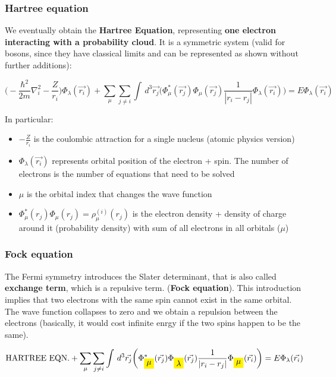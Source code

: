		\subsubsection{Hartree equation}
		We eventually obtain the \textbf{Hartree Equation}, representing \textbf{one electron interacting with a probability cloud}.
		It is a symmetric system (valid for bosons, since they have classical limits and can be represented as shown without further additions):

		$$\bigg(-\frac{\hbar^2}{2m}\nabla^2_i-\frac{Z}{r_i}\bigg)\Phi_\lambda(\vec{r_i})+\sum_\mu \sum_{j \neq i} \int\,d^3\vec{r_j}\bigg(\Phi^*_\mu(\vec{r_j})\Phi_\mu(\vec{r_j})\frac{1}{|r_i-r_j|}\Phi_\lambda(\vec{r_i})\bigg)=E\Phi_\lambda(\vec{r_i})$$

		In particular:

		\begin{multicols}{2}
			\begin{itemize}
				\item $-\frac{Z}{r_i}$ is the coulombic attraction for a single nucleus (atomic physics version)
				\item $\Phi_\lambda(\vec{r_i})$ represents orbital position of the electron + spin. The number of electrons is the number of equations that need to be solved
				\item $\mu$ is the orbital index that changes the wave function
				\item $\Phi^*_\mu(r_j)\Phi_\mu(r_j) = \rho_\mu^{(i)}(r_j)$ is the electron density + density of charge around it (probability density) with sum of all electrons in all orbitals ($\mu$)
			\end{itemize}
		\end{multicols}

		\subsubsection{Fock equation}
		The Fermi symmetry introduces the Slater determinant, that is also called \textbf{exchange term}, which is a repulsive term. (\textbf{Fock equation}).
		This introduction implies that two electrons with the same spin cannot exist in the same orbital.
		The wave function collapses to zero and we obtain a repulsion between the electrons (basically, it would cost infinite enrgy if the two spins happen to be the same).

		$$\text{HARTREE EQN.}+\sum_\mu \sum_{j \neq i} \int\,d^3\vec{r_j}\bigg(\Phi^*_{\mathcolorbox{yellow}{\mu}}(\vec{r_j})\Phi_{\mathcolorbox{yellow}{\lambda}}(\vec{r_j})\frac{1}{|r_i-r_j|}\Phi_{\mathcolorbox{yellow}{\mu}}(\vec{r_i})\bigg)=E\Phi_\lambda(\vec{r_i})$$

